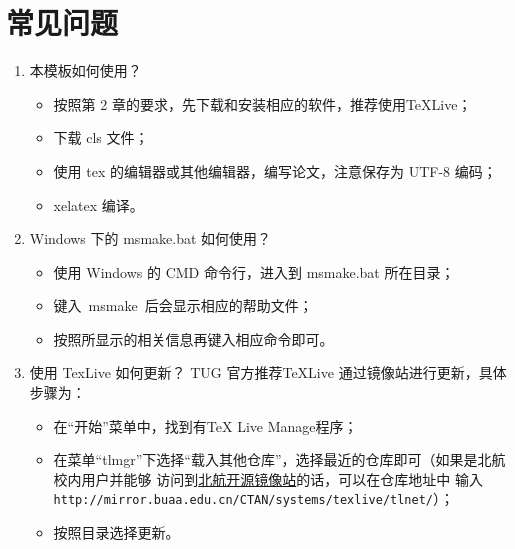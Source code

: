 \chapter{常见问题}
\label{chapter-faq}
\begin{enumerate}
\item 本模板如何使用？
\label{faq-howtouse}
\begin{itemize}
    \item 按照第 2 章的要求，先下载和安装相应的软件，推荐使用\TeX{}Live；
    \item 下载 cls 文件；
    \item 使用 tex 的编辑器或其他编辑器，编写论文，注意保存为 UTF-8 编码；
    \item xelatex 编译。
\end{itemize}
\item Windows 下的 msmake.bat 如何使用？
\label{faq-msmake}
\begin{itemize}
    \item 使用 Windows 的 CMD 命令行，进入到 msmake.bat 所在目录；
    \item 键入~msmake~后会显示相应的帮助文件；
    \item 按照所显示的相关信息再键入相应命令即可。
\end{itemize}
\item 使用 TexLive 如何更新？
\label{faq-texliveupdate}
TUG 官方推荐\TeX{}Live 通过镜像站进行更新，具体步骤为：
\begin{itemize}
    \item 在“开始”菜单中，找到有TeX Live Manage程序；
    \item 在菜单“tlmgr”下选择“载入其他仓库”，选择最近的仓库即可（如果是北航校内用户并能够
    访问到\href{http://mirror.buaa.edu.cn/}{北航开源镜像站}的话，可以在仓库地址中
    输入\texttt{http://mirror.buaa.edu.cn/CTAN/systems/texlive/tlnet/}）；
    \item 按照目录选择更新。
\end{itemize}
\end{enumerate}
